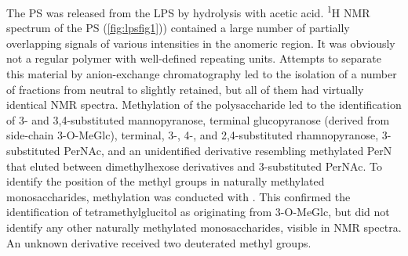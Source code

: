 		The \ac{PS} was released from the \ac{LPS} by hydrolysis with acetic acid. \textsuperscript{1}H \ac{NMR} spectrum of the \ac{PS} (\cref{fig:lpsfig1})) contained a large number of partially overlapping signals of various intensities in the anomeric region. It was obviously not a regular polymer with well-defined repeating units. Attempts to separate this material by anion-exchange chromatography led to the isolation of a number of fractions from neutral to slightly retained, but all of them had virtually identical \ac{NMR} spectra. Methylation of the polysaccharide led to the identification of 3- and 3,4-substituted mannopyranose, terminal glucopyranose (derived from side-chain 3-O-MeGlc), terminal, 3-, 4-, and 2,4-substituted rhamnopyranose, 3-substituted PerNAc, and an unidentified derivative resembling methylated PerN that eluted between dimethylhexose derivatives and 3-substituted PerNAc. To identify the position of the methyl groups in naturally methylated monosaccharides, methylation was conducted with . This confirmed the identification of tetramethylglucitol as originating from 3-O-MeGlc, but did not identify any other naturally methylated monosaccharides, visible in \ac{NMR} spectra. An unknown derivative received two deuterated methyl groups.

